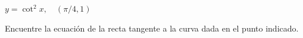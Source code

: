 \item $y = \cot^2 x, \quad (\pi/4, 1)$
\par
Encuentre la ecuación de la recta tangente a la curva dada en el punto indicado.
